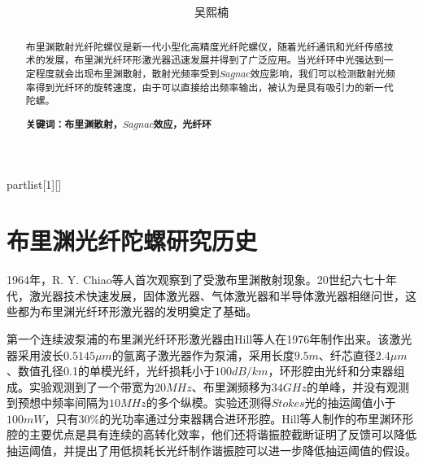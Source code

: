 \documentclass[UTF8]{ctexart}
\author{
	吴熙楠}
\title{
	\heiti{受激布里渊散射陀螺仪}
}
\begin{document}
	\maketitle
	\newtheorem{definition}{定义}[subsection]
	\newtheorem{function}{公式}[subsection]
	\newtheorem{summary}{小结}[subsection]
	\newtheorem{deduction}{推论}[subsection]
	\newtheorem{property}{性质}[subsection]
	\newtheorem{theo}{定理}[subsection]
	\newtheorem{step}{步骤}[subsection]
	\newtheorem{remark}{注记}[subsection]
	\newtheorem{proof}{证明}[subsection]
	\newenvironment{Theorem}[1][]{\par\noindent\textbf{定理}(#1)\quad}{\par}
	\newcommand{\rbra}[1]{\left( #1 \right)}
	\newcommand{\sbra}[1]{\left[ #1 \right]}
	\newcommand{\cbra}[1]{\left\{ #1 \right\}}
	\newcommand{\pbra}[1]{\left< #1 \right>}
	\newcommand{\abs}[1]{\left| #1 \right|}
	\newcommand{\fs}[2]{\displaystyle\frac{#1}{#2}}
	
	\newenvironment{myproof}{{\color{blue}证：}}
	
	\newenvironment{partlist}[1][]
	{\begin{enumerate}[itemsep=0pt, label=(\arabic*), wide, labelindent=\parindent, listparindent=\parindent, #1]}
		{\end{enumerate}}
	
	\renewcommand{\contentsname}{目录} %
	\tableofcontents
	\newpage
	\renewcommand{\abstractname}{\large 摘要\\}
	\begin{abstract}
		布里渊散射光纤陀螺仪是新一代小型化高精度光纤陀螺仪，随着光纤通讯和光纤传感技术的发展，布里渊光纤环形激光器迅速发展并得到了广泛应用。当光纤环中光强达到一定程度就会出现布里渊散射，散射光频率受到$Sagnac$效应影响，我们可以检测散射光频率得到光纤环的旋转速度，由于可以直接给出频率输出，被认为是具有吸引力的新一代陀螺。
		
		\textbf{关键词：布里渊散射，$Sagnac$效应，光纤环}
	\end{abstract}
\section{布里渊光纤陀螺研究历史}
1964年，R. Y. Chiao等人首次观察到了受激布里渊散射现象。20世纪六七十年代，激光器技术快速发展，固体激光器、气体激光器和半导体激光器相继问世，这些都为布里渊光纤环形激光器的发明奠定了基础。


第一个连续波泵浦的布里渊光纤环形激光器由Hill等人在1976年制作出来。该激光器采用波长$0.5145 \mu m $的氩离子激光器作为泵浦，采用长度$9.5 m$、纤芯直径$2.4 \mu m$ 、数值孔径0.1的单模光纤，光纤损耗小于$100 dB/km$，环形腔由光纤和分束器组成。实验观测到了一个带宽为$20 MHz$、布里渊频移为$34 GHz$的单峰，并没有观测到预想中频率间隔为$10 MHz$的多个纵模。实验还测得$Stokes$光的抽运阈值小于$100 mW$，只有30\%的光功率通过分束器耦合进环形腔。Hill等人制作的布里渊环形腔的主要优点是具有连续的高转化效率，他们还将谐振腔截断证明了反馈可以降低抽运阈值，并提出了用低损耗长光纤制作谐振腔可以进一步降低抽运阈值的假设。
\end{document}
